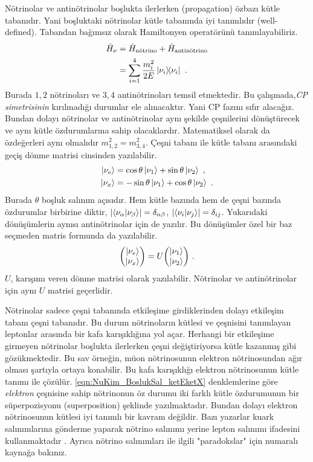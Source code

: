 Nötrinolar ve antinötrinolar boşlukta ilerlerken (propagation) özbazı kütle tabanıdır. Yani boşluktaki nötrinolar kütle tabanında iyi tanımlıdır (well-defined). Tabandan bağımsız olarak Hamiltonyen operatörünü tanımlayabiliriz.
\begin{align} \label{eqn:NuKim_BoslukSal_Hnu_op}
	\nonumber \hat{H}_{\nu} & = \hat{H}_{\text{n\"{o}trino}} + \hat{H}_{\text{antin\"{o}trino}}\\
						    & = \sum^{4}_{i=1}\frac{m_{i}^{2}}{2E} \dyad{\nu_{i}}{\nu_{i}}\text{ .}
\end{align}
Burada $ 1,2 $ nötrinoları ve $ 3,4 $ antinötrinoları temsil etmektedir. Bu çalışmada,\emph{CP simetrisinin} kırılmadığı durumlar ele alınacaktır. Yani CP fazını sıfır alacağız. Bundan dolayı nötrinolar ve antinötrinolar aynı şekilde çeşnilerini dönüştürecek ve aynı kütle özdurumlarına sahip olacaklardır. Matematiksel olarak da özdeğerleri aynı olmalıdır $ m^{2}_{1,2} = m^{2}_{3,4} $. Çeşni tabanı ile kütle tabanı arasındaki geçiş dönme matrisi cinsinden yazılabilir. 
\begin{align}\label{eqn:NuKim_BoslukSal_ketEketX}
	\ket{\nu_{e}} & =  \cos \theta \ket{\nu_{1}} + \sin \theta \ket{\nu_{2}} \text{ ,} \\
	\ket{\nu_{x}} & = -\sin \theta \ket{\nu_{1}} + \cos \theta \ket{\nu_{2}} \text{ .}
\end{align}
Burada $ \theta $ boşluk salınım açısıdır. Hem kütle bazında hem de çeşni bazında özdurumlar birbirine diktir, $\abs{\braket{\nu_{\alpha}}{\nu_{\beta}}}=\delta_{\alpha\beta} $, $ \abs{\braket{\nu_{i}}{\nu_{j}}}=\delta_{ij} $. Yukarıdaki dönüşümlerin aynısı antinötrinolar için de yazılır. Bu dönüşümler özel bir baz seçmeden matris formunda da yazılabilir. 
\begin{equation}
	\mqty(\ket{\nu_{e}} \\ \ket{\nu_{x}} ) = U \mqty(\ket{\nu_{1}} \\ \ket{\nu_{2}} ) \text{ .}
\end{equation}
$ U $, karışımı veren dönme matrisi olarak yazılabilir. Nötrinolar ve antinötrinolar için aynı $ U $ matrisi geçerlidir. 

Nötrinolar sadece çeşni tabanında etkileşime girdiklerinden dolayı etkileşim tabanı çeşni tabanıdır. Bu durum nötrinoların kütlesi ve çeşnisini tanımlayan leptonlar arasında bir kafa karışıklığına yol açar. Herhangi bir etkileşime girmeyen nötrinolar boşlukta ilerlerken çeşni değiştiriyorsa kütle kazanmış gibi gözükmektedir. Bu sav örneğin, müon nötrinosunun elektron nötrinosundan ağır olması şartıyla ortaya konabilir. Bu kafa karışıklığı elektron nötrinosunun kütle tanımı ile çözülür. \eqref{eqn:NuKim_BoslukSal_ketEketX} denklemlerine göre \emph{elektron} çeşnisine sahip nötrinonun öz durumu iki farklı kütle özdurumunun bir süperpozisyonu (superposition) şeklinde yazılmaktadır. Bundan dolayı elektron nötrinosunun kütlesi iyi tanımlı bir kavram değildir. Bazı yazarlar kuark salınımlarına gönderme yaparak nötrino salınımı yerine lepton salınımı ifadesini kullanmaktadır \cite{Kayser:2001ki}. Ayrıca nötrino salınımları ile ilgili "paradokslar" için \cite{Akhmedov:2009rb} numaralı kaynağa bakınız.

